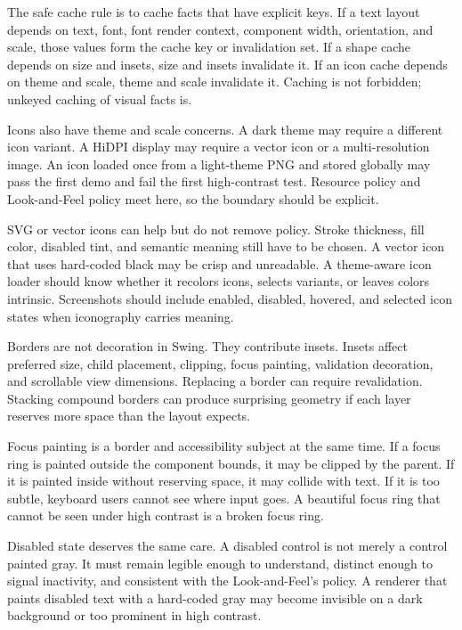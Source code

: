 The safe cache rule is to cache facts that have explicit keys. If a text layout depends on text, font, font render context, component width, orientation, and scale, those values form the cache key or invalidation set. If a shape cache depends on size and insets, size and insets invalidate it. If an icon cache depends on theme and scale, theme and scale invalidate it. Caching is not forbidden; unkeyed caching of visual facts is.

Icons also have theme and scale concerns. A dark theme may require a different icon variant. A HiDPI display may require a vector icon or a multi-resolution image. An icon loaded once from a light-theme PNG and stored globally may pass the first demo and fail the first high-contrast test. Resource policy and Look-and-Feel policy meet here, so the boundary should be explicit.

SVG or vector icons can help but do not remove policy. Stroke thickness, fill color, disabled tint, and semantic meaning still have to be chosen. A vector icon that uses hard-coded black may be crisp and unreadable. A theme-aware icon loader should know whether it recolors icons, selects variants, or leaves colors intrinsic. Screenshots should include enabled, disabled, hovered, and selected icon states when iconography carries meaning.

Borders are not decoration in Swing. They contribute insets. Insets affect preferred size, child placement, clipping, focus painting, validation decoration, and scrollable view dimensions. Replacing a border can require revalidation. Stacking compound borders can produce surprising geometry if each layer reserves more space than the layout expects.

Focus painting is a border and accessibility subject at the same time. If a focus ring is painted outside the component bounds, it may be clipped by the parent. If it is painted inside without reserving space, it may collide with text. If it is too subtle, keyboard users cannot see where input goes. A beautiful focus ring that cannot be seen under high contrast is a broken focus ring.

Disabled state deserves the same care. A disabled control is not merely a control painted gray. It must remain legible enough to understand, distinct enough to signal inactivity, and consistent with the Look-and-Feel's policy. A renderer that paints disabled text with a hard-coded gray may become invisible on a dark background or too prominent in high contrast.

